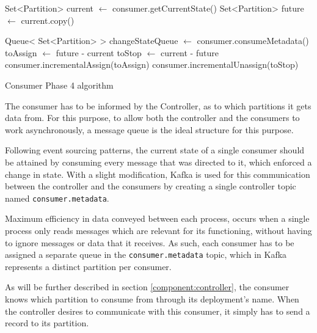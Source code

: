 \IncMargin{1em} 
\begin{algorithm}[h]

    Set<Partition> current $\gets$ consumer.getCurrentState()\; 
    Set<Partition> future $\gets$ current.copy()\;

    Queue< Set<Partition> > changeStateQueue $\gets$ consumer.consumeMetadata()\;
    toAssign $\gets$ future - current\; \label{algo:phase_4_toAssign} 
    toStop $\gets$ current - future\; 
    consumer.incrementalAssign(toAssign)\;
    consumer.incrementalUnassign(toStop)\; \label{algo:phase_4_incremental_assign}

\caption{Consumer Phase 4 algorithm} 
\label{algo:phase_4}
\end{algorithm}
\DecMargin{1em}

The consumer has to be informed by the Controller, as to which partitions it
gets data from. For this purpose, to allow both the controller and the consumers
to work asynchronously, a message queue is the ideal structure for this purpose.

Following event sourcing patterns, the current state of a single consumer should
be attained by consuming every message that was directed to it, which enforced a
change in state. With a slight modification, Kafka is used for this
communication between the controller and the consumers by creating a single
controller topic named \lstinline[language=Python]{consumer.metadata}.

Maximum efficiency in data conveyed between each process, occurs when a single
process only reads messages which are relevant for its functioning, without
having to ignore messages or data that it receives. As such, each consumer has
to be assigned a separate queue in the
\lstinline[language=Python]{consumer.metadata} topic, which in Kafka represents
a distinct partition per consumer.

As will be further described in section \ref{component:controller}, the consumer
knows which partition to consume from through its deployment's name. When the
controller desires to communicate with this consumer, it simply has to send a
record to its partition. 

